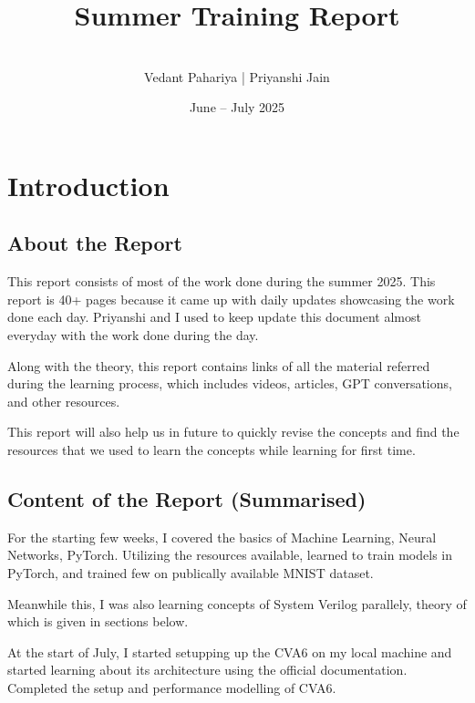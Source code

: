 \documentclass[12pt, a4paper]{article}
\title{Summer Training Report}
\author{\\[-5ex] Vedant Pahariya | Priyanshi Jain}
\date{June -- July 2025}
\begin{document}
\maketitle
\tableofcontents
\newpage

\section{Introduction}

\subsection{About the Report}
This report consists of most of the work done during the summer 2025. This report is 40+ pages because it came up with daily updates showcasing the work done each day. Priyanshi and I used to keep update this document almost everyday with the work done during the day. 

\vspace{0.5em}

Along with the theory, this report contains links of all the material referred during the learning process, which includes videos, articles, GPT conversations, and other resources. 

\vspace{0.5em}

This report will also help us in future to quickly revise the concepts and find the resources that we used to learn the concepts while learning for first time.

\subsection{Content of the Report (Summarised)}

For the starting few weeks, I covered the basics of Machine Learning, Neural Networks, PyTorch. Utilizing the resources available, learned to train models in PyTorch, and trained few on publically available MNIST dataset.

Meanwhile this, I was also learning concepts of System Verilog parallely, theory of which is given in sections below.

At the start of July, I started setupping up the CVA6 on my local machine and started learning about its architecture using the official documentation.
Completed the setup and performance modelling of CVA6.

\vspace{0.5em}
\end{document}
